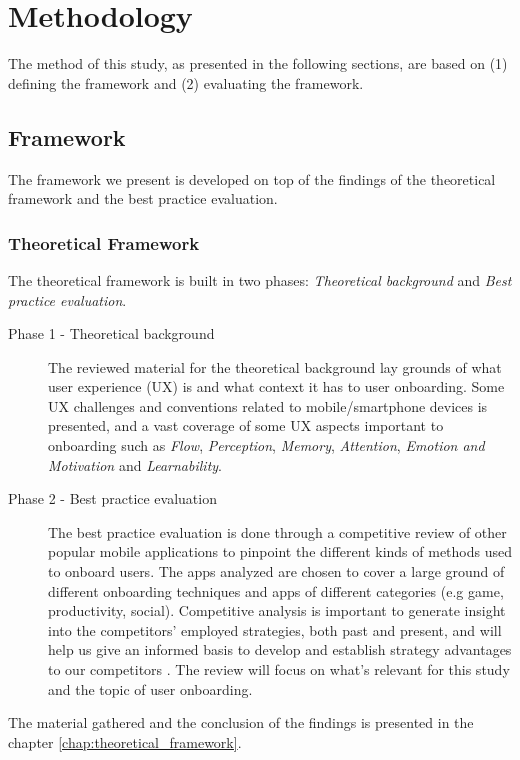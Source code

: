 \chapter{Methodology}
\label{chap:methodology}

The method of this study, as presented in the following sections, are based on (1) defining the framework and (2)
 evaluating the framework.
\section{Framework}
The framework we present is developed on top of the findings of the theoretical framework and the best practice evaluation.

\subsection{Theoretical Framework}
The theoretical framework is built in two phases: \textit{Theoretical background} and \textit{Best practice evaluation}.

\begin{description}
  \item [Phase 1 - Theoretical background] The reviewed material for the theoretical background lay grounds of what user experience (UX) is and what context it has to user onboarding. Some UX challenges and conventions related to mobile/smartphone devices is presented, and a vast coverage of some UX aspects important to onboarding such as \textit{Flow}, \textit{Perception}, \textit{Memory}, \textit{Attention}, \textit{Emotion and Motivation} and \textit{Learnability}.
  \item [Phase 2 - Best practice evaluation] The best practice evaluation is done through a competitive review \cite{Schade2013} of other popular mobile applications to pinpoint the different kinds of methods used to onboard users. The apps analyzed are chosen to cover a large ground of different onboarding techniques and apps of different categories (e.g game, productivity, social). Competitive analysis is important to generate insight into the competitors' employed strategies, both past and present, and will help us give an informed basis to develop and establish strategy advantages to our competitors \cite{Wilson2010}. The review will focus on what's relevant for this study and the topic of user onboarding.
\end{description}
The material gathered and the conclusion of the findings is presented in the chapter \ref{chap:theoretical_framework}.

